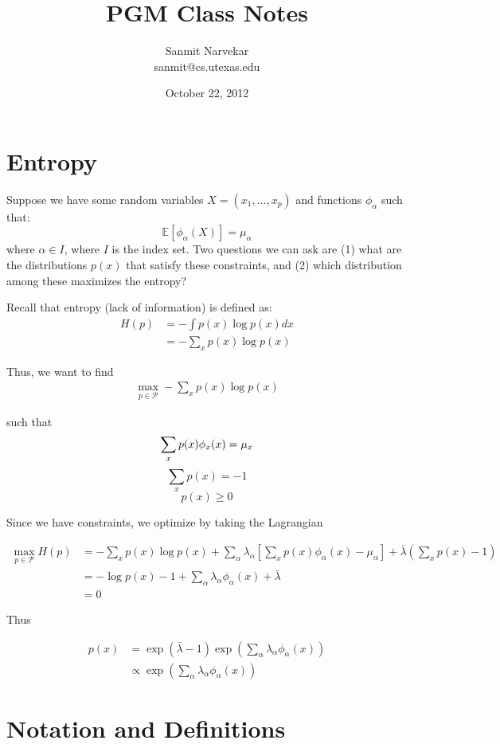 \documentclass[11pt]{article}
\title{PGM Class Notes}
\author{Sanmit Narvekar \\ sanmit@cs.utexas.edu}
\date{October 22, 2012}
\newcommand{\E}{\mathbb{E}}
\begin{document}
\maketitle

\section{Entropy}

Suppose we have some random variables $X = (x_1, \ldots , x_p)$ and functions $\phi_\alpha$ such that: 
$$
\E[\phi_{\alpha}(X)] = \mu_\alpha
$$
where $\alpha \in I$, where $I$ is the index set. Two questions we can ask are (1) what are the distributions $p(x)$ that satisfy these constraints, and (2) which distribution among these maximizes the entropy?

Recall that entropy (lack of information) is defined as:
\begin{align}
H(p)
& = -\int p(x) \log p(x) dx \\
& = - \sum_x p(x) \log p(x)
\end{align}

Thus, we want to find
\begin{align}
\max_{p \in \mathcal P} -\sum_x p(x) \log p(x)
\end{align}

such that
$$ \sum_x p(x) \phi_x (x) = \mu_x \\ $$ 
$$ \sum_x p(x) = -1 $$ 
$$ p(x) \geq 0 $$

Since we have constraints, we optimize by taking the Lagrangian

\begin{align}
\max_{p \in \mathcal P} H(p) 
& = -\sum_x p(x) \log p(x) + \sum_\alpha \lambda_\alpha [ \sum_x p(x) \phi_\alpha(x) - \mu_\alpha] + \bar{\lambda} (\sum_x p(x) - 1) \\
& = - \log p(x) -1 + \sum_\alpha \lambda_\alpha \phi_\alpha (x) + \bar{\lambda} \\
& = 0
\end{align}

Thus

\begin{align}
p(x) 
& = \exp (\bar{\lambda} - 1) \exp(\sum_\alpha \lambda_\alpha \phi_\alpha (x)) \\
& \propto \exp (\sum_\alpha \lambda_\alpha \phi_\alpha (x))
\end{align}

\section{Notation and Definitions}
\end{document}
